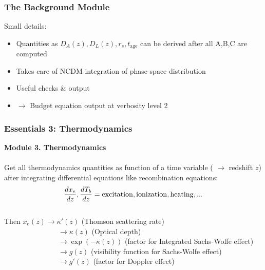 \begin{frame}[fragile]

\end{frame}


\begin{frame}[fragile]
	\frametitle{The Background Module}

	Small details:
	\begin{itemize}
		\item Quantities as $D_A(z), D_L(z), r_s, t_\mathrm{age}$ can be derived after all A,B,C are computed
		\item Takes care of NCDM integration of phase-space distribution
		\item Useful checks \& output
		\item $\to$ Budget equation output at verbosity level 2
	\end{itemize}
	
\end{frame}



\begin{frame}[fragile]
\frametitle{Essentials 3: Thermodynamics}

{\bf Module 3. Thermodynamics}\\
\mbox{}\\
Get all thermodynamics quantities as function of a time variable ({\Red \CLASS{}} $\rightarrow$ redshift $z$) after integrating differential equations like recombination equations:
$$
\frac{d x_e}{dz} , \frac{d T_b}{dz}= {\rm excitation}, {\rm ionization}, {\rm heating}, ... 
$$
\vspace{-0.5cm}\\
Then $x_e(z) \rightarrow \kappa'(z)$ (Thomson scattering rate)\\
~~~~~~~~~~~~~~~$\rightarrow \kappa(z)$ (Optical depth)\\
~~~~~~~~~~~~~~~$\rightarrow \exp(-\kappa(z))$ (factor for Integrated Sachs-Wolfe effect)\\
~~~~~~~~~~~~~~~$\rightarrow g(z)$ (visibility function for Sachs-Wolfe effect)\\
~~~~~~~~~~~~~~~$\rightarrow g'(z)$ (factor for Doppler effect)\\

\end{frame}


